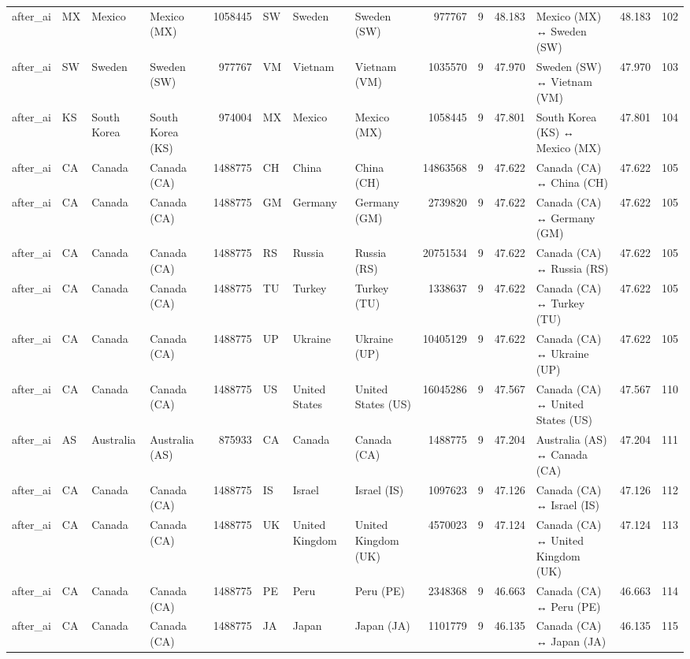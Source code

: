 \begin{tabular}{llllrlllrrrlrr}
after\_ai & MX & Mexico & Mexico (MX) & 1058445 & SW & Sweden & Sweden (SW) & 977767 & 9 & 48.183 & Mexico (MX) ↔ Sweden (SW) & 48.183 & 102 \\
after\_ai & SW & Sweden & Sweden (SW) & 977767 & VM & Vietnam & Vietnam (VM) & 1035570 & 9 & 47.970 & Sweden (SW) ↔ Vietnam (VM) & 47.970 & 103 \\
after\_ai & KS & South Korea & South Korea (KS) & 974004 & MX & Mexico & Mexico (MX) & 1058445 & 9 & 47.801 & South Korea (KS) ↔ Mexico (MX) & 47.801 & 104 \\
after\_ai & CA & Canada & Canada (CA) & 1488775 & CH & China & China (CH) & 14863568 & 9 & 47.622 & Canada (CA) ↔ China (CH) & 47.622 & 105 \\
after\_ai & CA & Canada & Canada (CA) & 1488775 & GM & Germany & Germany (GM) & 2739820 & 9 & 47.622 & Canada (CA) ↔ Germany (GM) & 47.622 & 105 \\
after\_ai & CA & Canada & Canada (CA) & 1488775 & RS & Russia & Russia (RS) & 20751534 & 9 & 47.622 & Canada (CA) ↔ Russia (RS) & 47.622 & 105 \\
after\_ai & CA & Canada & Canada (CA) & 1488775 & TU & Turkey & Turkey (TU) & 1338637 & 9 & 47.622 & Canada (CA) ↔ Turkey (TU) & 47.622 & 105 \\
after\_ai & CA & Canada & Canada (CA) & 1488775 & UP & Ukraine & Ukraine (UP) & 10405129 & 9 & 47.622 & Canada (CA) ↔ Ukraine (UP) & 47.622 & 105 \\
after\_ai & CA & Canada & Canada (CA) & 1488775 & US & United States & United States (US) & 16045286 & 9 & 47.567 & Canada (CA) ↔ United States (US) & 47.567 & 110 \\
after\_ai & AS & Australia & Australia (AS) & 875933 & CA & Canada & Canada (CA) & 1488775 & 9 & 47.204 & Australia (AS) ↔ Canada (CA) & 47.204 & 111 \\
after\_ai & CA & Canada & Canada (CA) & 1488775 & IS & Israel & Israel (IS) & 1097623 & 9 & 47.126 & Canada (CA) ↔ Israel (IS) & 47.126 & 112 \\
after\_ai & CA & Canada & Canada (CA) & 1488775 & UK & United Kingdom & United Kingdom (UK) & 4570023 & 9 & 47.124 & Canada (CA) ↔ United Kingdom (UK) & 47.124 & 113 \\
after\_ai & CA & Canada & Canada (CA) & 1488775 & PE & Peru & Peru (PE) & 2348368 & 9 & 46.663 & Canada (CA) ↔ Peru (PE) & 46.663 & 114 \\
after\_ai & CA & Canada & Canada (CA) & 1488775 & JA & Japan & Japan (JA) & 1101779 & 9 & 46.135 & Canada (CA) ↔ Japan (JA) & 46.135 & 115 \\

\end{tabular}
